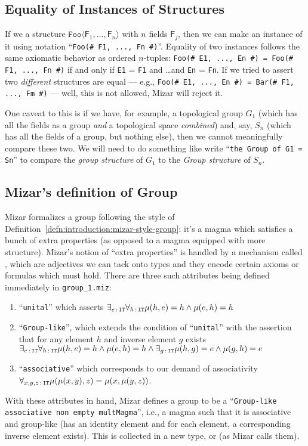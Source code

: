 \subsection{Equality of Instances of Structures}
If we a structure $\mathtt{Foo} \langle \mathsf{F}_{1},\dots,\mathsf{F}_{n}\rangle$
with $n$ fields $\mathsf{F}_{j}$, then we can make an instance of it
using notation ``\verb$Foo(# F1, ..., Fn #)$''. Equality of two
instances follows the same axiomatic behavior as ordered $n$-tuples:
\verb$Foo(# E1, ..., En #) = Foo(# F1, ..., Fn #)$ if and only if
\verb#E1# = \verb#F1# and \dots and \verb#En# = \verb#Fn#. If we tried
to assert two \emph{different} structures are equal --- e.g.,
\verb$Foo(# E1, ..., En #) = Bar(# F1, ..., Fm #)$ --- well, this is not
allowed, Mizar will reject it.

One caveat to this is if we have, for example, a topological group
$G_{1}$ (which has all the fields as a group \emph{and} a topological
space \emph{combined}) and, say, $S_{n}$ (which has all the fields of a
group, but nothing else), then we cannot meaningfully compare these
two. We will need to do something like write ``\verb#the Group of G1 = Sn#''
to compare the \emph{group structure} of $G_{1}$ to the \emph{Group structure}
of $S_{n}$.

\subsection{Mizar's definition of Group}
Mizar formalizes a group following the style of
Definition~\ref{defn:introduction:mizar-style-group}: it's a magma which
satisfies a bunch of extra properties (as opposed to a magma equipped
with more structure). Mizar's notion of ``extra properties'' is handled
by a mechanism called , which
are adjectives we can tack onto types and they encode certain axioms or
formulas which must hold. There are three such attributes being defined
immediately in \texttt{group\_1.miz}:
\begin{enumerate}
\item ``\texttt{unital}'' which asserts
  $\exists_{e\mathop{:}\nolimits \mathtt{IT}}\forall_{h\mathop{:}\nolimits \mathtt{IT}} \mu(h,e)=h\land\mu(e,h)=h$
\item ``\texttt{Group-like}'',
  which extends the condition of ``\texttt{unital}'' with the assertion
  that for any element $h$ and inverse element $g$ exists
  $\exists_{e\mathop{:}\nolimits \mathtt{IT}}\forall_{h\mathop{:}\nolimits \mathtt{IT}} \mu(h,e)=h\land\mu(e,h)=h\land\exists_{g\mathop{:}\nolimits \mathtt{IT}}\mu(h,g)=e\land\mu(g,h)=e$
\item ``\texttt{associative}''
  which corresponds to our demand of associativity
  $\forall_{x,y,z\mathop{:}\nolimits \mathtt{IT}}\mu(\mu(x,y),z)=\mu(x,\mu(y,z))$.
\end{enumerate}
With these attributes in hand, Mizar defines a group to be a
``\texttt{Group-like associative non empty multMagma}'', i.e., a magma such
that it is associative and group-like (has an identity element and for
each element, a corresponding inverse element exists). This is collected
in a new type, or  (as Mizar calls them).


